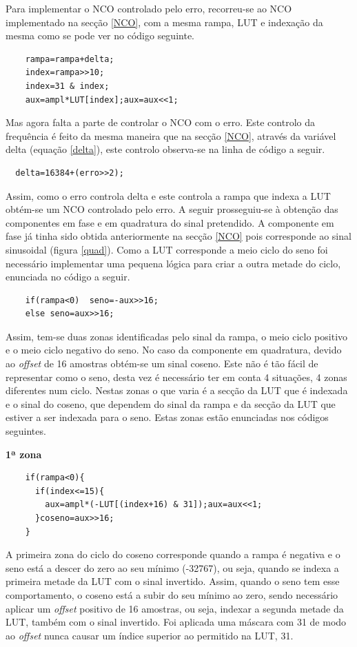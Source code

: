 \documentclass[11pt]{article}
\numberwithin{equation}{section}
\begin{document}
Para implementar o NCO controlado pelo erro, recorreu-se ao NCO implementado na secção \ref{NCO}, com a mesma rampa, LUT e indexação da mesma como se pode ver no código seguinte.
\begin{lstlisting}
	rampa=rampa+delta;
	index=rampa>>10;
	index=31 & index;
	aux=ampl*LUT[index];aux=aux<<1;
\end{lstlisting}

Mas agora falta a parte de controlar o NCO com o erro. Este controlo da frequência é feito da mesma maneira que na secção \ref{NCO}, através da variável delta (equação \ref{delta}), este controlo observa-se na linha de código a seguir.
\begin{lstlisting}
  delta=16384+(erro>>2);
\end{lstlisting}

Assim, como o erro controla delta e este controla a rampa que indexa a LUT obtém-se um NCO controlado pelo erro.
A seguir prosseguiu-se à obtenção das componentes em fase e em quadratura do sinal pretendido. A componente em fase já tinha sido obtida anteriormente na secção \ref{NCO} pois corresponde ao sinal sinusoidal (figura \ref{quad}). Como a LUT corresponde a meio ciclo do seno foi necessário implementar uma pequena lógica para criar a outra metade do ciclo, enunciada no código a seguir.
\begin{lstlisting}
	if(rampa<0)  seno=-aux>>16;
	else seno=aux>>16;
\end{lstlisting}

Assim, tem-se duas zonas identificadas pelo sinal da rampa, o meio ciclo positivo e o meio ciclo negativo do seno.
No caso da componente em quadratura, devido ao \textit{offset} de 16 amostras obtém-se um sinal coseno. Este não é tão fácil de representar como o seno, desta vez é necessário ter em conta 4 situações, 4 zonas diferentes num ciclo. Nestas zonas o que varia é a secção da LUT que é indexada e o sinal do coseno, que dependem do sinal da rampa e da secção da LUT que estiver a ser indexada para o seno. Estas zonas estão enunciadas nos códigos seguintes.
\vspace{1mm}

\textbf{1ª zona}
\begin{lstlisting}
	if(rampa<0){
	  if(index<=15){
	    aux=ampl*(-LUT[(index+16) & 31]);aux=aux<<1;
	  }coseno=aux>>16;
	}
\end{lstlisting}

A primeira zona do ciclo do coseno corresponde quando a rampa é negativa e o seno está a descer do zero ao seu mínimo (-32767), ou seja, quando se indexa a primeira metade da LUT com o sinal invertido. Assim, quando o seno tem esse comportamento, o coseno está a subir do seu mínimo ao zero, sendo necessário aplicar um \textit{offset} positivo de 16 amostras, ou seja, indexar a segunda metade da LUT, também com o sinal invertido. Foi aplicada uma máscara com 31 de modo ao \textit{offset} nunca causar um índice superior ao permitido na LUT, 31.
\vspace{1mm}
\end{document}
